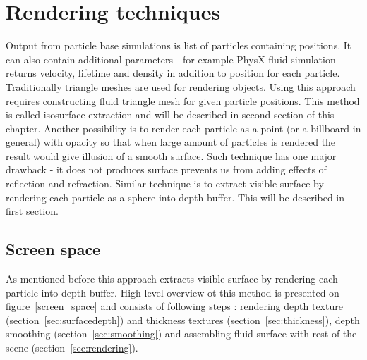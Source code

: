 
\chapter{Rendering techniques} %

\graphicspath{{techniques/figures/}}


Output from particle base simulations is list of particles containing positions. It can also contain additional parameters - for example PhysX fluid simulation returns velocity, lifetime and density in addition to position for each particle. 
Traditionally triangle meshes are used for rendering objects. Using this approach requires constructing fluid triangle mesh for given particle positions. This method is called isosurface extraction and will be described in second section of this chapter. 
Another possibility is to render each particle as a point (or a billboard in general) with opacity so that when large amount of particles is rendered the result would give illusion of a smooth surface. Such technique has one major drawback - it does not produces surface prevents us from adding effects of reflection and refraction.
Similar technique is to extract visible surface by rendering each particle as a sphere into depth buffer. This will be described in first section.

\section{Screen space}
As mentioned before this approach extracts visible surface by rendering each particle into depth buffer. High level overview ot this method is presented on figure~\ref{screen_space} and consists of following steps \cite{laanSainz2009}: rendering depth texture (section~\ref{sec:surfacedepth}) and thickness textures (section~\ref{sec:thickness}), depth smoothing (section~\ref{sec:smoothing}) and assembling fluid surface with rest of the scene (section~\ref{sec:rendering}).

